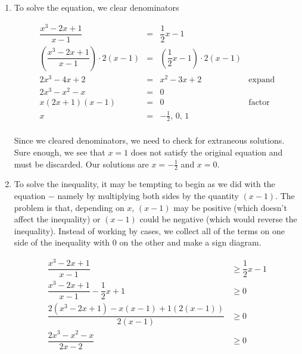 {
\begin{enumerate}

\item  To solve the equation, we clear denominators

\[ \begin{array}{rclr}

\dfrac{x^3-2x+1}{x-1} & = & \dfrac{1}{2}x-1 & \\ [10pt]

\left(\dfrac{x^3-2x+1}{x-1}\right) \cdot 2(x-1) & = & \left( \dfrac{1}{2}x-1 \right) \cdot 2(x-1) & \\ [10pt]

2x^3 - 4x + 2 & = & x^2-3x+2 & \mbox{expand} \\

2x^3 -x^2 - x & = & 0 & \\

x(2x+1)(x-1) & = & 0 & \mbox{factor}\\

x & = & -\frac{1}{2}, \, 0, \, 1 & \\


\end{array}\]

Since we cleared denominators, we need to check for extraneous solutions.  Sure enough, we see that $x=1$ does not satisfy the original equation and must be discarded.  Our solutions are $x=-\frac{1}{2}$ and $x=0$.

\item  To solve the inequality, it may be tempting to begin as we did with the equation $-$ namely by multiplying both sides by the quantity $(x-1)$.  The problem is that, depending on $x$, $(x-1)$ may be positive (which doesn't affect the inequality) or $(x-1)$ could be negative (which would reverse the inequality).  Instead of working by cases, we collect all of the terms on one side of the inequality with $0$ on the other and make a sign diagram.

\noindent\hskip-25pt\begin{minipage}{\textwidth}
\begin{align*}
\dfrac{x^3-2x+1}{x-1} & \geq \dfrac{1}{2}x-1  \\ 
\dfrac{x^3-2x+1}{x-1}  - \dfrac{1}{2} x + 1& \geq  0 \\
\dfrac{2\left(x^3-2x+1\right)-x(x-1)+1(2(x-1))}{2(x-1)} & \geq  0  \tag*{get a common denominator} \\ 
\dfrac{2x^3-x^2-x}{2x-2} & \geq  0  \tag*{expand}
\end{align*}
\end{minipage}


\end{enumerate}}
